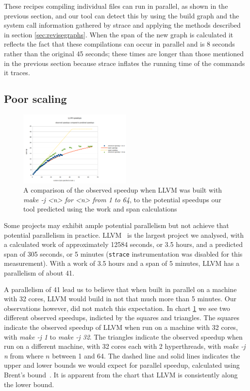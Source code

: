 \documentclass[sigconf,10pt,authorversion]{acmart}\settopmatter{printfolios=true,printccs=false,printacmref=false}
\begin{document}
  These recipes compiling individual files can run in parallel, as shown in the previous section,
  and our tool can detect this by using the build graph and the system call information gathered
  by strace and applying the methods described in section \ref{sec:revisegraphs}.  When the span
  of the new graph is calculated it reflects the fact that these compilations can occur in
  parallel and is 8 seconds rather than the original 45 seconds; these times are longer than
  those mentioned in the previous section because strace inflates the running time of the
  commands it traces.

\subsection{Poor scaling}
\label{sec:scalability}

\begin{figure}[t]
  \includegraphics[width=0.5\textwidth]{llvm-speedup-w-64}
  \caption{A comparison of the observed speedup when LLVM was built
    with \emph{make -j <n> for <n> from 1 to 64}, to the potential
    speedups our tool predicted using the work and span calculations}
  \label{fig:llvm}
\end{figure}

Some projects may exhibit ample potential parallelism but not achieve
that potential parallelism in practice.  LLVM~\citep{LLVM:CGO04} is
the largest project we analysed, with a calculated work of
approximately 12584 seconds, or 3.5 hours, and a predicted span of 305
seconds, or 5 minutes (\verb|strace| instrumentation was disabled for
this measurement). With a work of 3.5 hours and a span of 5 minutes,
LLVM has a parallelism of about 41.

A parallelism of 41 lead us to believe that when built in parallel on
a machine with 32 cores, LLVM would build in not that much more than 5
minutes.  Our observations however, did not match this expectation.
In chart \ref{fig:llvm} we see two different observed speedups,
indicted by the squares and triangles.  The squares indicate the
observed speedup of LLVM when run on a machine with 32 cores, with
\emph{make -j 1} to \emph{make -j 32}.  The triangles indicate the
observed speedup when run on a different machine, with 32 cores each
with 2 hyperthreads, with \emph{make -j n} from where $n$ between 1
and 64.  The dashed line and solid lines indicates the upper and lower
bounds we would expect for parallel speedup, calculated using Brent's
bound~\cite{brents}.  It
is apparent from the chart that LLVM is consistently along the lower
bound.
\end{document}

